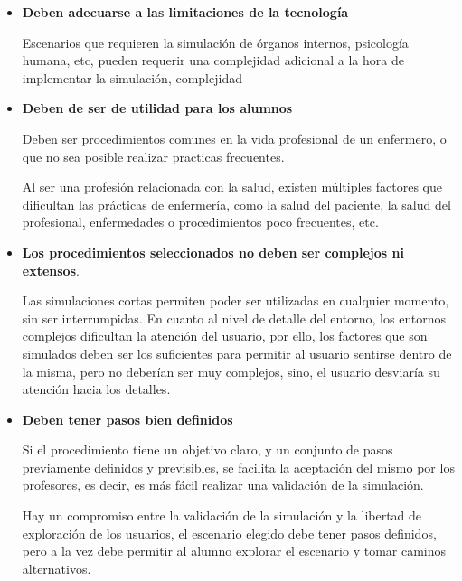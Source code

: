 \begin{itemize}

    \item \textbf{Deben adecuarse a las limitaciones de la tecnología} 

    Escenarios que requieren la simulación de órganos internos, psicología
    humana, etc, pueden requerir una complejidad adicional a la hora de
    implementar la simulación, complejidad 

    \item \textbf{Deben de ser de utilidad para los alumnos} 

    
    Deben ser procedimientos comunes en la vida profesional de un enfermero, o
    que no sea posible realizar practicas frecuentes. 

    Al ser una profesión relacionada con la salud, existen múltiples factores
    que dificultan las prácticas de enfermería, como la salud del paciente, la
    salud del profesional, enfermedades o procedimientos poco frecuentes, etc.

\item \textbf{Los procedimientos seleccionados no deben ser complejos ni
        extensos}. 

    Las simulaciones cortas permiten poder ser utilizadas en cualquier momento,
    sin ser interrumpidas. En cuanto al nivel de detalle del entorno, los
    entornos complejos dificultan la atención del
    usuario\cite{videojuegos:gonzaleztardon}, por ello, los factores que son
    simulados deben ser los suficientes para permitir al usuario sentirse dentro
    de la misma, pero no deberían ser muy complejos, sino, el usuario desviaría su
    atención hacia los detalles.

\item \textbf{Deben tener pasos bien definidos}
    
    Si el procedimiento tiene un objetivo claro, y un conjunto de pasos
    previamente definidos y previsibles, se facilita la aceptación del mismo por
    los profesores, es decir, es más fácil realizar una validación de la
    simulación.

    Hay un compromiso entre la validación de la simulación y la libertad de
    exploración de los usuarios, el escenario elegido debe tener pasos
    definidos, pero a la vez debe permitir al alumno explorar el escenario y
    tomar caminos alternativos.


\end{itemize}

